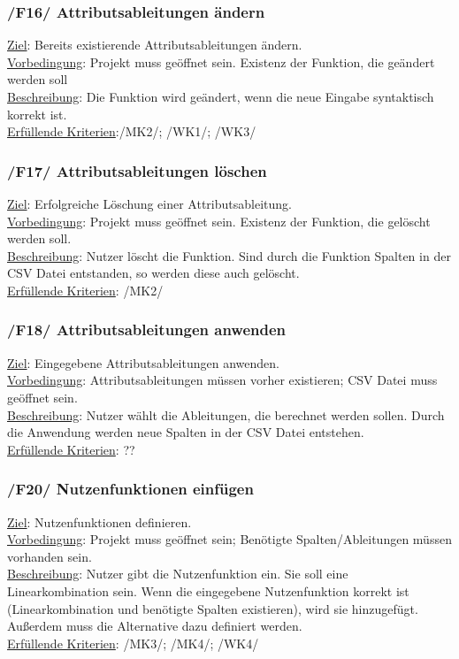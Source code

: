 \documentclass{article}
\begin{document}
\subsubsection*{/F16/ Attributsableitungen ändern}
\underline{Ziel}: Bereits existierende Attributsableitungen ändern. \\
\underline{Vorbedingung}: Projekt muss geöffnet sein. Existenz der Funktion, die geändert werden soll  \\
\underline{Beschreibung}: Die Funktion wird geändert, wenn die neue Eingabe syntaktisch korrekt ist.\\
\underline{Erfüllende Kriterien}:/MK2/; /WK1/; /WK3/
\subsubsection*{/F17/ Attributsableitungen löschen}
\underline{Ziel}: Erfolgreiche Löschung einer Attributsableitung. \\
\underline{Vorbedingung}: Projekt muss geöffnet sein. Existenz der Funktion, die gelöscht werden soll.\\
\underline{Beschreibung}: Nutzer löscht die Funktion. Sind durch die Funktion Spalten in der CSV Datei entstanden, so werden diese auch gelöscht. \\
\underline{Erfüllende Kriterien}: /MK2/
\subsubsection*{/F18/ Attributsableitungen anwenden}
\underline{Ziel}: Eingegebene Attributsableitungen anwenden. \\
\underline{Vorbedingung}: Attributsableitungen müssen vorher existieren; CSV Datei muss geöffnet sein. \\
\underline{Beschreibung}: Nutzer wählt die Ableitungen, die berechnet werden sollen. Durch die Anwendung werden neue Spalten in der CSV Datei entstehen.\\
\underline{Erfüllende Kriterien}: ??
\newpage
\subsubsection*{/F20/ Nutzenfunktionen einfügen}
\underline{Ziel}: Nutzenfunktionen definieren. \\
\underline{Vorbedingung}: Projekt muss geöffnet sein; Benötigte Spalten/Ableitungen müssen vorhanden sein.\\
\underline{Beschreibung}: Nutzer gibt die Nutzenfunktion ein. Sie soll eine Linearkombination sein. Wenn die eingegebene Nutzenfunktion korrekt ist (Linearkombination und benötigte Spalten existieren), wird sie hinzugefügt. Außerdem muss die Alternative dazu definiert werden. \\
\underline{Erfüllende Kriterien}: /MK3/; /MK4/; /WK4/
\end{document}
